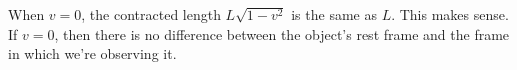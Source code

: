 When $v=0$, the contracted length $L\sqrt{1-v^2}$ is the same as $L$.
This makes sense. If $v=0$, then there is no difference between the
object's rest frame and the frame in which we're observing it.
